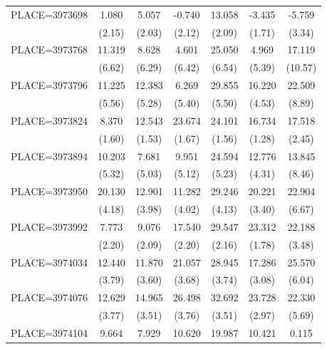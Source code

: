 {\begin{tabular}{l*{6}{c}}
PLACE=3973698       &       1.080&       5.057&      -0.740&      13.058&      -3.435&      -5.759\\
                    &      (2.15)&      (2.03)&      (2.12)&      (2.09)&      (1.71)&      (3.34)\\
PLACE=3973768       &      11.319&       8.628&       4.601&      25.050&       4.969&      17.119\\
                    &      (6.62)&      (6.29)&      (6.42)&      (6.54)&      (5.39)&     (10.57)\\
PLACE=3973796       &      11.225&      12.383&       6.269&      29.855&      16.220&      22.509\\
                    &      (5.56)&      (5.28)&      (5.40)&      (5.50)&      (4.53)&      (8.89)\\
PLACE=3973824       &       8.370&      12.543&      23.674&      24.101&      16.734&      17.518\\
                    &      (1.60)&      (1.53)&      (1.67)&      (1.56)&      (1.28)&      (2.45)\\
PLACE=3973894       &      10.203&       7.681&       9.951&      24.594&      12.776&      13.845\\
                    &      (5.32)&      (5.03)&      (5.12)&      (5.23)&      (4.31)&      (8.46)\\
PLACE=3973950       &      20.130&      12.901&      11.282&      29.246&      20.221&      22.904\\
                    &      (4.18)&      (3.98)&      (4.02)&      (4.13)&      (3.40)&      (6.67)\\
PLACE=3973992       &       7.773&       9.076&      17.540&      29.547&      23.312&      22.188\\
                    &      (2.20)&      (2.09)&      (2.20)&      (2.16)&      (1.78)&      (3.48)\\
PLACE=3974034       &      12.440&      11.870&      21.057&      28.945&      17.286&      25.570\\
                    &      (3.79)&      (3.60)&      (3.68)&      (3.74)&      (3.08)&      (6.04)\\
PLACE=3974076       &      12.629&      14.965&      26.498&      32.692&      23.728&      22.330\\
                    &      (3.77)&      (3.51)&      (3.76)&      (3.51)&      (2.97)&      (5.69)\\
PLACE=3974104       &       9.664&       7.929&      10.620&      19.987&      10.421&       0.115\\

\end{tabular}}
